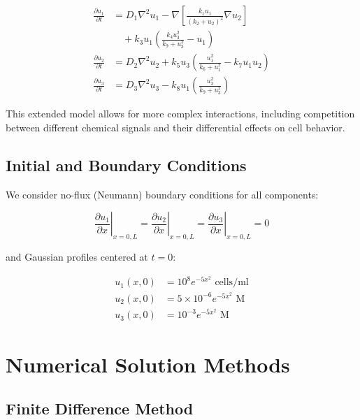 \documentclass[conference]{IEEEtran}
\begin{document}
\begin{align}
\frac{\partial u_1}{\partial t} &= D_1 \nabla^2 u_1 - \nabla \left[ \frac{k_1 u_1}{(k_2 + u_2)^2} \nabla u_2 \right] \nonumber \\
& \quad + k_3 u_1 \left( \frac{k_4 u_3^2}{k_9 + u_3^2} - u_1 \right) \label{eq:u_1_evolution} \\
\frac{\partial u_2}{\partial t} &= D_2 \nabla^2 u_2 + k_5 u_3 \left( \frac{u_1^2}{k_6 + u_1^2} - k_7 u_1 u_2 \right) \label{eq:u_2_evolution} \\
\frac{\partial u_3}{\partial t} &= D_3 \nabla^2 u_3 - k_8 u_1 \left( \frac{u_3^2}{k_9 + u_3^2} \right) \label{eq:u_3_evolution}
\end{align}

This extended model allows for more complex interactions, including competition between different chemical signals and their differential effects on cell behavior.

\subsection{Initial and Boundary Conditions}
We consider no-flux (Neumann) boundary conditions for all components:

\begin{equation}
\left.\frac{\partial u_1}{\partial x}\right|_{x=0,L} = \left.\frac{\partial u_2}{\partial x}\right|_{x=0,L} = \left.\frac{\partial u_3}{\partial x}\right|_{x=0,L} = 0
\end{equation}

and Gaussian profiles centered at $t=0$:

\begin{align}
u_1(x,0) &= 10^8 e^{-5x^2} \text{ cells/ml} \label{eq:u_1_init} \\
u_2(x,0) &= 5\times10^{-6} e^{-5x^2} \text{ M} \label{eq:u_2_init} \\
u_3(x,0) &= 10^{-3} e^{-5x^2} \text{ M} \label{eq:u_3_init}
\end{align}

\section{Numerical Solution Methods}
\subsection{Finite Difference Method}
\end{document}

